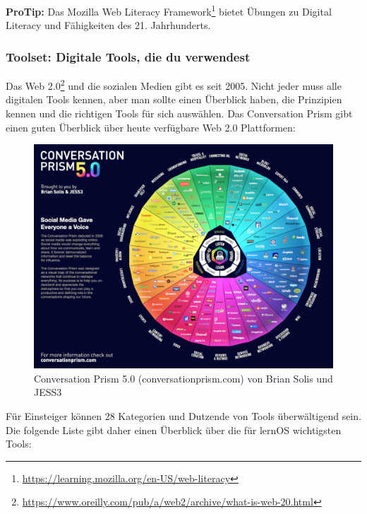 \documentclass[
  ngerman,
  paper=a4,
,captions=tableheading
]{scrartcl}
\DeclareRobustCommand{\href}[2]{#2\footnote{\url{#1}}}
\begin{document}
\textbf{ProTip:} Das Mozilla
\href{https://learning.mozilla.org/en-US/web-literacy}{Web Literacy
Framework} bietet Übungen zu Digital Literacy und Fähigkeiten des 21.
Jahrhunderts.

\hypertarget{toolset-digitale-tools-die-du-verwendest}{%
\subsubsection{Toolset: Digitale Tools, die du
verwendest}\label{toolset-digitale-tools-die-du-verwendest}}

Das
\href{https://www.oreilly.com/pub/a/web2/archive/what-is-web-20.html}{Web
2.0} und die sozialen Medien gibt es seit 2005. Nicht jeder muss alle
digitalen Tools kennen, aber man sollte einen Überblick haben, die
Prinzipien kennen und die richtigen Tools für sich auswählen. Das
Conversation Prism gibt einen guten Überblick über heute verfügbare Web
2.0 Plattformen:

\begin{figure}
\centering
\includegraphics{./tex2pdf.-c0ed5a8631023970/6b3c3be66bbf7be83f482f370fe8c95d5cbaa199.png}
\caption{Conversation Prism 5.0 (conversationprism.com) von Brian Solis
und JESS3}
\end{figure}

Für Einsteiger können 28 Kategorien und Dutzende von Tools überwältigend
sein. Die folgende Liste gibt daher einen Überblick über die für lernOS
wichtigsten Tools:
\end{document}
